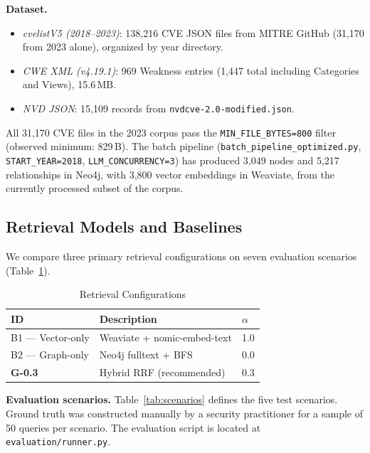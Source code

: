 \documentclass[conference]{IEEEtran}
\begin{document}
\textbf{Dataset.}
\begin{itemize}
  \item \emph{cvelistV5 (2018--2023)}: 138,216 CVE JSON files from MITRE GitHub
        (31,170 from 2023 alone), organized by year directory.
  \item \emph{CWE XML (v4.19.1)}: 969 Weakness entries (1,447 total including
        Categories and Views), 15.6\,MB.
  \item \emph{NVD JSON}: 15,109 records from \texttt{nvdcve-2.0-modified.json}.
\end{itemize}
All 31,170 CVE files in the 2023 corpus pass the \texttt{MIN\_FILE\_BYTES=800}
filter (observed minimum: 829\,B).
The batch pipeline (\texttt{batch\_pipeline\_optimized.py},
\texttt{START\_YEAR=2018}, \texttt{LLM\_CONCURRENCY=3}) has produced
3,049 nodes and 5,217 relationships in Neo4j, with 3,800 vector embeddings
in Weaviate, from the currently processed subset of the corpus.

\subsection{Retrieval Models and Baselines}

We compare three primary retrieval configurations on seven evaluation
scenarios (Table~\ref{tab:configs}).

\begin{table}[htbp]
  \centering
  \caption{Retrieval Configurations}
  \label{tab:configs}
  \begin{tabular}{lll}
    \toprule
    \textbf{ID} & \textbf{Description} & \textbf{$\alpha$} \\
    \midrule
    B1 — Vector-only & Weaviate + nomic-embed-text   & 1.0 \\
    B2 — Graph-only  & Neo4j fulltext + BFS          & 0.0 \\
    \textbf{G-0.3}   & Hybrid RRF (recommended)      & 0.3 \\
    \bottomrule
  \end{tabular}
\end{table}

\textbf{Evaluation scenarios.}
Table~\ref{tab:scenarios} defines the five test scenarios.
Ground truth was constructed manually by a security practitioner for a sample
of 50 queries per scenario.
The evaluation script is located at \texttt{evaluation/runner.py}.
\end{document}
